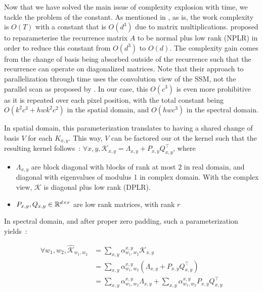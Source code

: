 Now that we have solved the main issue of complexity explosion with time, we tackle the problem of the constant. As mentioned in , as is, the work complexity is $O(T)$ with a constant that is $O(d^3)$ due to matrix multiplications.
\citet{TODO:S4SSM} proposed to reparameterise the recurrence matrix $A$ to be normal plus low rank (NPLR) in order to reduce this constant from $O(d^3)$ to $O(d)$. The complexity gain comes from the change of basis being absorbed outside of the recurrence such that the recurrence can operate on diagonalized matrices. Note that their approach to parallelization through time uses the convolution view of the SSM, not the parallel scan as proposed by \citet{TODO:S5SSM}.
In our case, this $O(c^3)$ is even more prohibitive as it is repeated over each pixel position, with the total constant being $O(k^2c^3 + hwk^2c^2)$ in the spatial domain, and $O(hwc^3)$ in the spectral domain.

In spatial domain, this parameterization translates to having a shared change of basis $V$ for each $K_{x,y}$. This way, $V$ can be factored our ot the kernel such that the resulting kernel follows~: $\forall x,y, \mathcal{K}_{x,y} = \Lambda_{x,y} + P_{x,y} Q_{x,y}^\top$, where
\begin{itemize}
    \item $\Lambda_{x,y}$ are block diagonal with blocks of rank at most $2$ in real domain, and diagonal with eigenvalues of modulus 1 in complex domain. With the complex view, $\mathcal{K}$ is diagonal plus low rank (DPLR).
    \item $P_{x,y}, Q_{x,y} \in \mathbb{R}^{d\times r}$ are low rank matrices, with rank $r$
\end{itemize}
In spectral domain, and after proper zero padding, such a parameterization yields~:

\begin{align*}
    \forall w_1,w_2, \widehat{\mathcal{K}}_{w_1,w_2} &= \sum_{x,y} \alpha_{w_1,w_2}^{x,y} \mathcal{K}_{x,y}\\
    &= \sum_{x,y} \alpha_{w_1,w_2}^{x,y} \left(\Lambda_{x,y} + P_{x,y} Q_{x,y}^\top\right)\\
    &= \sum_{x,y} \alpha_{w_1,w_2}^{x,y} \Lambda_{x,y} + \sum_{x,y} \alpha_{w_1,w_2}^{x,y}P_{x,y} Q_{x,y}^\top\\
\end{align*}

